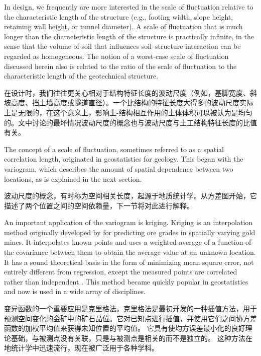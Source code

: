 \begin{ParaColumn}
    \switchcolumn*

    In design, we frequently are more interested in the scale of fluctuation relative to the characteristic length of the structure (e.g., footing width, slope height, retaining wall height, or tunnel diameter). A scale of fluctuation that is much longer than the characteristic length of the structure is practically infinite, in the sense that the volume of soil that influences soil–structure interaction can be regarded as homogeneous. The notion of a worst-case scale of fluctuation discussed herein also is related to the ratio of the scale of fluctuation to the characteristic length of the geotechnical structure.

    \switchcolumn

    在设计时，我们往往更关心相对于结构特征长度的波动尺度（例如，基脚宽度、斜坡高度、挡土墙高度或隧道直径）。一个比结构的特征长度大得多的波动尺度实际上是无限的，在这个意义上，影响土-结构相互作用的土体体积可以被认为是均匀的。文中讨论的最坏情况波动尺度的概念也与波动尺度与土工结构特征长度的比值有关。

    \switchcolumn*

    The concept of a scale of fluctuation, sometimes referred to as a spatial correlation length, originated in geostatistics for geology. This began with the variogram, which describes the amount of spatial dependence between two locations, as is explained in the next section.

    \switchcolumn

    波动尺度的概念，有时称为空间相关长度，起源于地质统计学。从方差图开始，它描述了两个位置之间的空间依赖量，下一节将对此进行解释。

    \switchcolumn*

    An important application of the variogram is kriging. Kriging is an interpolation method originally developed by \citet{Krige1951119,Krige196613} for predicting ore grades in spatially varying gold mines. It interpolates known points and uses a weighted average of a function of the covariance between them to obtain the average value at an unknown location. It has a sound theoretical basis in the form of minimizing mean square error, not entirely different from regression, except the measured points are correlated rather than independent \citep{Brockwell1991}. This method became quickly popular in geostatistics and now is used in a wide array of disciplines.

    \switchcolumn

    变异函数的一个重要应用是克里格法。克里格法是\citet{Krige1951119,Krige196613}最初开发的一种插值方法，用于预测空间变化的金矿中的矿石品位。它对已知点进行插值，并使用它们之间协方差函数的加权平均值来获得未知位置的平均值。 它具有使均方误差最小化的良好理论基础，与被测点没有关联，只是与被测点是相关的而不是独立的\citep{Brockwell1991}。 这种方法在地统计学中迅速流行，现在被广泛用于各种学科。


\end{ParaColumn}
